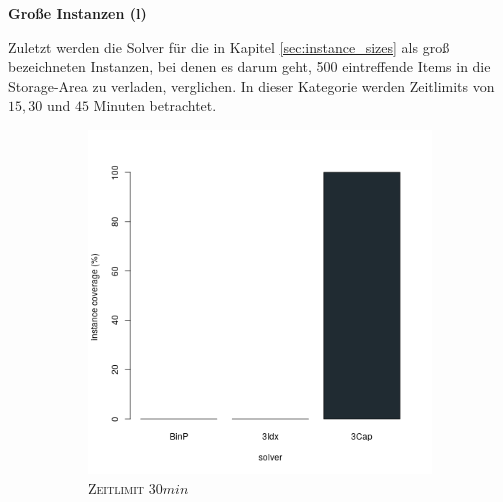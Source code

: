 \pagebreak

\textbf{Große Instanzen (l)}

Zuletzt werden die Solver für die in Kapitel \ref{sec:instance_sizes} als groß bezeichneten Instanzen,
bei denen es darum geht, 500 eintreffende Items in die Storage-Area zu verladen, verglichen.
In dieser Kategorie werden Zeitlimits von $15, 30$ und $45$ Minuten betrachtet.

\begin{figure}[H]
\centering

\begin{subfigure}[b]{0.3\textwidth}
\centering
\includegraphics[width=1.2\textwidth]{img/solver_instance_coverage_b=3_l_1800s.png}
\caption{\textsc{Zeitlimit} $30min$}
\label{fig:instance_coverage_b=3_l_a}
\end{subfigure}
\hfill
\begin{subfigure}[b]{0.3\textwidth}
\centering

\end{subfigure}
\end{figure}
